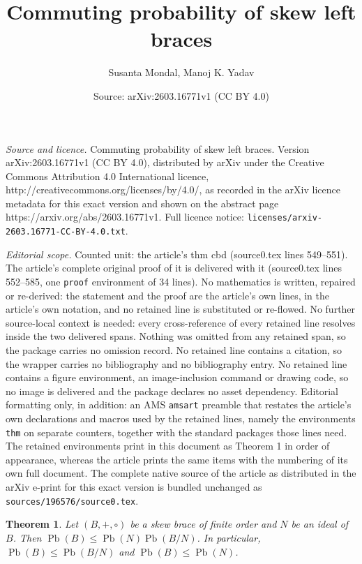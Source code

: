 \documentclass[10pt,a4paper]{amsart}
\title{Commuting probability of skew left braces}
\author{Susanta Mondal, Manoj K. Yadav}
\date{Source: arXiv:2603.16771v1 (CC BY 4.0)}
\newtheorem{thm}{Theorem}
\newcommand{\Pb}{\operatorname{Pb} }
\begin{document}
\maketitle

\noindent\emph{Source and licence.} Commuting probability of skew left braces. Version arXiv:2603.16771v1 (CC BY 4.0), distributed by arXiv under the Creative Commons Attribution 4.0 International licence, http://creativecommons.org/licenses/by/4.0/, as recorded in the arXiv licence metadata for this exact version and shown on the abstract page https://arxiv.org/abs/2603.16771v1. Full licence notice: \texttt{licenses/arxiv-2603.16771-CC-BY-4.0.txt}.\par\smallskip

\noindent\textit{Editorial scope.} Counted unit: the article's thm cbd (source0.tex lines 549--551). The article's complete original proof of it is delivered with it (source0.tex lines 552--585, one \texttt{proof} environment of 34 lines). No mathematics is written, repaired or re-derived: the statement and the proof are the article's own lines, in the article's own notation, and no retained line is substituted or re-flowed.  No further source-local context is needed: every cross-reference of every retained line resolves inside the two delivered spans.  Nothing was omitted from any retained span, so the package carries no omission record.  No retained line contains a citation, so the wrapper carries no bibliography and no bibliography entry.  No retained line contains a figure environment, an image-inclusion command or drawing code, so no image is delivered and the package declares no asset dependency.  Editorial formatting only, in addition: an AMS \texttt{amsart} preamble that restates the article's own declarations and macros used by the retained lines, namely the environments \texttt{thm} on separate counters, together with the standard packages those lines need.  The retained environments print in this document as Theorem 1 in order of appearance, whereas the article prints the same items with the numbering of its own full document.  The complete native source of the article as distributed in the arXiv e-print for this exact version is bundled unchanged as \texttt{sources/196576/source0.tex}.
\begin{thm}\label{Ideal and cbd}
Let $(B,+, \circ)$ be a  skew  brace of finite order and $N$ be an ideal of $B$. Then $\Pb(B)\leqslant \Pb(N)\Pb(B/N)$. In particular, $\Pb(B)\leqslant \Pb(B/N)$ and $\Pb(B) \leqslant \Pb(N)$.
\end{thm}
\end{document}
